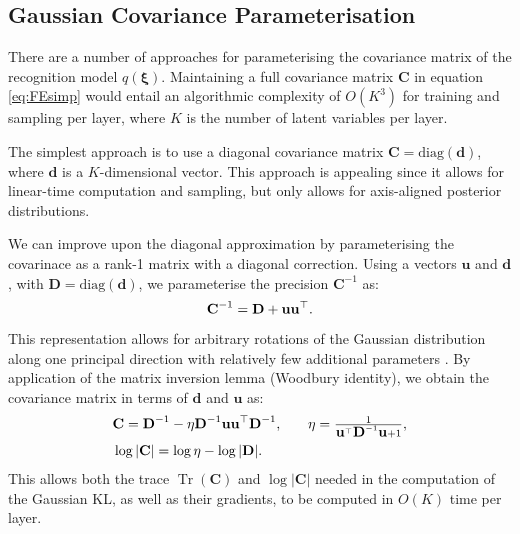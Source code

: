 \documentclass{article}
\DeclareMathOperator{\Tr}{Tr} %
\newcommand{\myvec}[1]{\mbox{$\mathbf{#1}$}}
\newcommand{\myvecsym}[1]{\mbox{$\boldsymbol{#1}$}}
\newcommand{\vxi}{\mbox{$\myvecsym{\xi}$}}
\newcommand{\vd}{\mbox{$\myvec{d}$}}
\newcommand{\vu}{\mbox{$\myvec{u}$}}
\newcommand{\vC}{\mbox{$\myvec{C}$}}
\newcommand{\vD}{\mbox{$\myvec{D}$}}
\begin{document}
\begin{bibunit}[icml2013]
\vspace{-3mm}
\subsection{Gaussian Covariance Parameterisation}
\label{sec:learning_covParam}

There are a number of approaches for parameterising the covariance matrix 
of the recognition model $q(\vxi)$. Maintaining a full covariance matrix 
$\vC$ in 
equation 
\eqref{eq:FEsimp} would 
entail an algorithmic complexity of $O(K^3)$ for training and sampling per layer, 
where $K$ is the number of latent variables per layer.

The simplest approach is to use a diagonal covariance matrix $\vC = 
\textrm{diag}(\vd)$, where $\vd$ is a $K$-dimensional vector. This 
approach is appealing since it allows for linear-time computation and 
sampling, but only allows for axis-aligned posterior distributions.

We can improve upon the diagonal approximation by 
parameterising the covarinace as a rank-1 matrix with a diagonal correction. 
Using a vectors $\vu$ and $\vd$, with $\vD = \textrm{diag}(\vd)$, we parameterise the precision 
 $\vC^{-1}$ as:
\vspace{-2mm}
\begin{equation}
\vC^{-1} = \vD + \vu \vu^\top. \label{eq:Cinv}
\vspace{-2mm}
\end{equation}
This representation allows for arbitrary rotations of the Gaussian distribution 
along one principal direction with relatively few additional parameters 
\citep{magdon-ismail2010a}. By application of the matrix inversion lemma (Woodbury identity), we obtain 
the covariance matrix in terms of $\vd$ and $\vu$ as:
\vspace{-2mm}
\begin{align}
& \vC  = \vD^{-1} - \eta \vD^{-1} \vu \vu^\top \vD^{-1}, \label{eq:C}  & 
\quad \eta = \tfrac{1}{\vu^\top \vD^{-1} \vu + 1}, \nonumber \\
& \log \vert \vC \vert  = \log \eta - \log \vert \vD \vert. 
\vspace{-2mm}
\end{align}
This allows both the trace $\Tr(\vC)$  and $\log \vert \vC \vert$ needed 
in the computation of the Gaussian KL, as well as their gradients, to be computed in $O(K)$ time per layer.


\end{bibunit}
\end{document}
